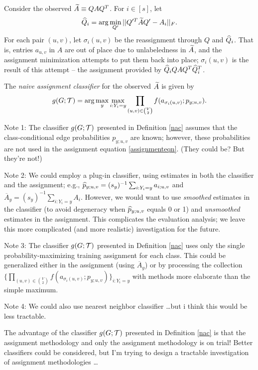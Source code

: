 Consider the observed $\widetilde{A} \equiv QAQ^T$.
For $i \in [s]$, let
\begin{eqnarray}\label{assignmenteqn}
\widehat{Q}_i = \arg\min_{Q'} ||Q'^T \widetilde{A} Q' - A_i||_F.
\end{eqnarray}
For each pair $(u,v)$, let $\sigma_i(u,v)$ be the reassignment through $Q$ and $\widehat{Q}_i$.
That is, entries $a_{u,v}$ in $A$ are out of place due to unlabeledness in $\widetilde{A}$,
and the assignment minimization attempts to put them back into place;
$\sigma_i(u,v)$ is the result of this attempt -- the assignment provided by
$\widehat{Q}_i Q A Q^T \widehat{Q}_i^T$.




\label{nac}
The {\em naive assignment classifier} for the observed $\widetilde{A}$ is given by
\begin{eqnarray}
g(G;\mathcal{T}) = {\arg\max_y \max_{i:Y_i=y} \prod_{(u,v) \in {V \choose 2}} f(a_{\sigma_i(u,v)};p_{y;u,v})}.
\end{eqnarray}

Note 1:
The classifier $g(G;\mathcal{T})$ presented in Definition \ref{nac}
assumes that the class-conditional edge probabilities $p_{y;u,v}$ are known;
however, these probabilities are not used in the assignment equation \ref{assignmenteqn}.
(They could be? But they're not!)

Note 2:
We could employ a plug-in classifier,
using estimates in both the classifier and the assignment;
e.g., $\widehat{p}_{y;u,v} = (s_y)^{-1} \sum_{i:Y_i=y} a_{i;u,v}$
and $\overline{A}_y = (s_y)^{-1} \sum_{i:Y_i=y} A_{i}$.
However, we would want to use {\em smoothed} estimates in the classifier
(to avoid degeneracy when $\widehat{p}_{y;u,v}$ equals 0 or 1)
and {\em unsmoothed} estimates in the assignment.
This complicates the evaluation analysis;
we leave this more complicated (and more realistic) investigation for the future.

Note 3:
The classifier $g(G;\mathcal{T})$ presented in Definition \ref{nac}
uses only the single probability-maximizing training assignment for each class.
This could be generalized either in the assignment (using $\overline{A}_y$)
or by processing the collection
$\{\prod_{(u,v) \in {V \choose 2}} f(a_{\sigma_i(u,v)};p_{y;u,v})\}_{i:Y_i=y}$
with methods more elaborate than the simple maximum.

Note 4:
We could also use nearest neighbor classifier \dots but i think this would be less tractable.

The advantage of the classifier $g(G;\mathcal{T})$ presented in Definition \ref{nac}
is that the assignment methodology and only the assignment methodology is on trial!
Better classifiers could be considered,
but I'm trying to design a tractable investigation of assignment methodologies \dots

